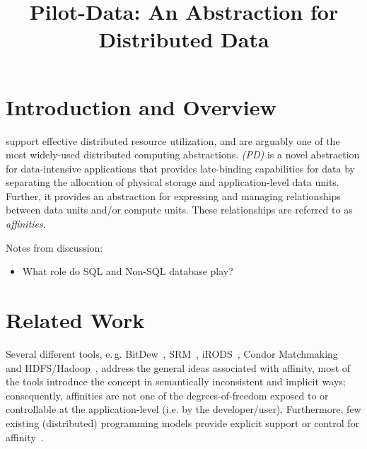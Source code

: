 \documentclass[conference]{IEEEtran}
\begin{document}

\title{Pilot-Data: An Abstraction for Distributed Data}

\author{}

\date{}
\maketitle

\begin{abstract} 


\end{abstract}

\section{Introduction and Overview} 

\pilotjobs support effective distributed resource utilization, and are
arguably one of the most widely-used distributed computing abstractions.
\emph{\pilotdata (PD)} is a novel abstraction for data-intensive applications
that provides late-binding capabilities for data by separating the allocation
of physical storage and application-level data units. Further, it provides an
abstraction for expressing and managing relationships between data units
and/or compute units. These relationships are referred to as
\emph{affinities}.

Notes from discussion:
\begin{itemize}
	\item What role do SQL and Non-SQL database play?
\end{itemize}



\section{Related Work}

Several different tools, e.\,g.
BitDew~\cite{Fedak:2008:BPE:1413370.1413416}, SRM~\cite{srm-ogf},
iRODS~\cite{Rajasekar:2010:IPI:1855046}, Condor
Matchmaking~\cite{Raman:1998:MDR:822083.823222} and
HDFS/Hadoop~\cite{hadoop}, address the general ideas associated with
affinity, most of the tools introduce the concept in semantically
inconsistent and implicit ways; consequently, affinities are not one
of the degrees-of-freedom exposed to or controllable at the
application-level (i.e.  by the developer/user). Furthermore, few
existing (distributed) programming models provide explicit support or
control for affinity~\cite{ideas}.
\end{document}
